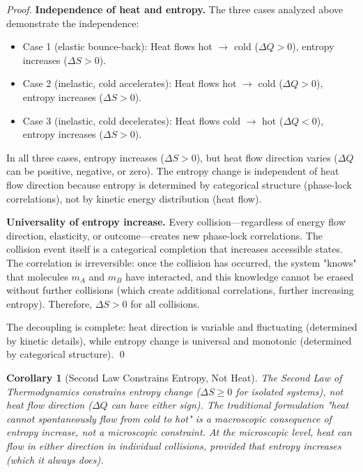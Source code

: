 \documentclass[12pt,a4paper]{article}
\newtheorem{corollary}[theorem]{Corollary}
\theoremstyle{definition}
\theoremstyle{remark}
\begin{document}
\begin{proof}
\textbf{Independence of heat and entropy.}
The three cases analyzed above demonstrate the independence:
\begin{itemize}
    \item Case 1 (elastic bounce-back): Heat flows hot $\to$ cold ($\Delta Q > 0$), entropy increases ($\Delta S > 0$).
    \item Case 2 (inelastic, cold accelerates): Heat flows hot $\to$ cold ($\Delta Q > 0$), entropy increases ($\Delta S > 0$).
    \item Case 3 (inelastic, cold decelerates): Heat flows cold $\to$ hot ($\Delta Q < 0$), entropy increases ($\Delta S > 0$).
\end{itemize}

In all three cases, entropy increases ($\Delta S > 0$), but heat flow direction varies ($\Delta Q$ can be positive, negative, or zero). The entropy change is independent of heat flow direction because entropy is determined by categorical structure (phase-lock correlations), not by kinetic energy distribution (heat flow).

\textbf{Universality of entropy increase.}
Every collision—regardless of energy flow direction, elasticity, or outcome—creates new phase-lock correlations. The collision event itself is a categorical completion that increases accessible states. The correlation is irreversible: once the collision has occurred, the system "knows" that molecules $m_A$ and $m_B$ have interacted, and this knowledge cannot be erased without further collisions (which create additional correlations, further increasing entropy). Therefore, $\Delta S > 0$ for all collisions.

The decoupling is complete: heat direction is variable and fluctuating (determined by kinetic details), while entropy change is universal and monotonic (determined by categorical structure). \qed
\end{proof}

\begin{corollary}[Second Law Constrains Entropy, Not Heat]
\label{cor:second_law_entropy}
The Second Law of Thermodynamics constrains entropy change ($\Delta S \geq 0$ for isolated systems), not heat flow direction ($\Delta Q$ can have either sign). The traditional formulation "heat cannot spontaneously flow from cold to hot" is a macroscopic consequence of entropy increase, not a microscopic constraint. At the microscopic level, heat can flow in either direction in individual collisions, provided that entropy increases (which it always does).
\end{corollary}
\end{document}
